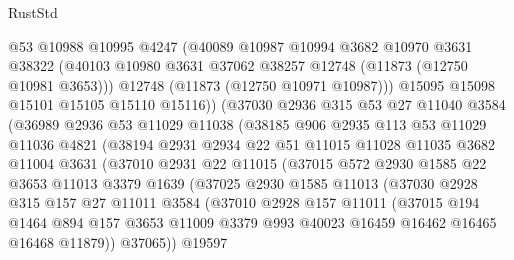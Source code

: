 \begin{lexlean}{RustStd}
\begin{coremodule}
              @53
              @10988
              @10995
              @4247
              (@40089
                @10987
                @10994
                @3682
                @10970
                @3631
                @38322
                (@40103 @10980 @3631 @37062 @38257 @12748 (@11873 (@12750 @10981 @3653)))
                @12748
                (@11873 (@12750 @10971 @10987)))
              @15095
              @15098
              @15101
              @15105
              @15110
              @15116))
          (@37030
            @2936
            @315
            @53
            @27
            @11040
            @3584
            (@36989
              @2936
              @53
              @11029
              @11038
              (@38185
                @906
                @2935
                @113
                @53
                @11029
                @11036
                @4821
                (@38194
                  @2931
                  @2934
                  @22
                  @51
                  @11015
                  @11028
                  @11035
                  @3682
                  @11004
                  @3631
                  (@37010
                    @2931
                    @22
                    @11015
                    (@37015
                      @572
                      @2930
                      @1585
                      @22
                      @3653
                      @11013
                      @3379
                      @1639
                      (@37025
                        @2930
                        @1585
                        @11013
                        (@37030
                          @2928
                          @315
                          @157
                          @27
                          @11011
                          @3584
                          (@37010
                            @2928
                            @157
                            @11011
                            (@37015
                              @194
                              @1464
                              @894
                              @157
                              @3653
                              @11009
                              @3379
                              @993
                              @40023
                              @16459
                              @16462
                              @16465
                              @16468
                              @11879))
                          @37065))
                      @19597

\end{coremodule}
\end{lexlean}
